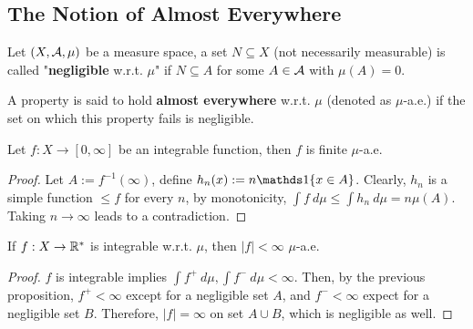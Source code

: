 \documentclass[11pt]{article}
\begin{document}
	\subsection{The Notion of Almost Everywhere}
	\begin{definition}
		Let $(X, \mathcal{{A}}, \mu)$ be a measure space, a set $N \subseteq X$ (not necessarily measurable) is called "\textbf{negligible} w.r.t. $\mu$" if $N \subseteq A$ for some $A \in \mathcal{{A}}$ with $\mu(A)=0$.
		
		A property is said to hold \textbf{almost everywhere} w.r.t. $\mu$ (denoted as $\mu$-a.e.) if the set on which this property fails is negligible.
	\end{definition}
	
	\begin{proposition}
		Let $f: X \to [0, \infty]$ be an integrable function, then $f$ is finite $\mu$-a.e.
		\begin{proof}
			Let $A := f^{-1}(\infty)$, define $h_n(x) := n \id{x \in A}$. Clearly, $h_n$ is a simple function $\leq f$ for every $n$, by monotonicity, $\int f\ d\mu \leq \int h_n\ d\mu = n \mu(A)$. Taking $n\to\infty$ leads to a contradiction.
		\end{proof}
	\end{proposition}
	
	\begin{corollary}
		If $f: X \to \mathbb{R}^*$ is integrable w.r.t. $\mu$, then $|f| < \infty$ $\mu$-a.e.
		\begin{proof}
			$f$ is integrable implies $\int f^+\ d\mu, \int f^-\ d\mu < \infty$. Then,
			by the previous proposition, $f^+ < \infty$ except for a negligible set $A$, and $f^- < \infty$ expect for a negligible set $B$. Therefore, $|f| = \infty$ on set $A \cup B$, which is negligible as well.
		\end{proof}
	\end{corollary}
	
\end{document}
